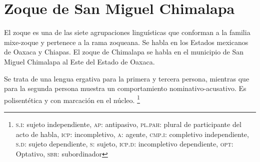 \section*{Zoque de San Miguel Chimalapa}

\noindent El zoque es una de las siete agrupaciones linguísticas que conforman a la familia mixe-zoque y pertenece a la rama zoqueana. Se habla en los Estados mexicanos de Oaxaca y Chiapas. El zoque de Chimalapa se habla en el municipio de San Miguel Chimalapa al Este del Estado de Oaxaca.

Se trata de una lengua ergativa para la primera y tercera persona, mientras que para la segunda persona muestra un comportamiento nominativo-acusativo. Es polisentética y con marcación en el núcleo. \footnote{\textsc{s.i:} sujeto independiente, \textsc{ap:} antipasivo, \textsc{pl.pah: }plural de participante del acto de habla, \textsc{icp:} incompletivo, \textsc{a:} agente, \textsc{cmp.i:} completivo independiente, \textsc{s.d:} sujeto dependiente, \textsc{s:} sujeto, \textsc{icp.d:} incompletivo dependiente, \textsc{opt:} Optativo, \textsc{sbr:} subordinador}  \vspace{0.5cm}

